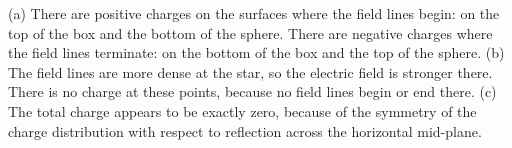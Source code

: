 (a) There are positive charges on the surfaces
where the field lines begin: on the top of the 
box and the bottom of the sphere. There are negative charges
where the field lines terminate: on the bottom of the box
and the top of the sphere.
(b) The field lines are more dense at the star, so the electric
field is stronger there. There is no charge at these points,
because no field lines begin or end there.
(c) The total charge appears to be exactly zero, because
of the symmetry of the charge distribution with respect to
reflection across the horizontal mid-plane.
